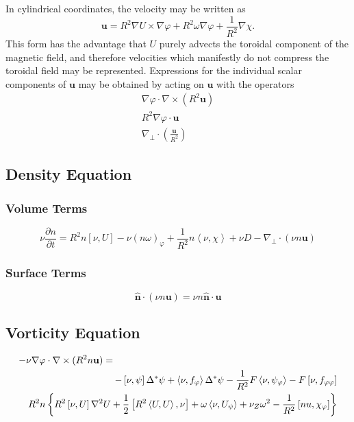 \documentclass[letterpaper]{book}
\newcommand{\ddt}[1]{\frac{\partial #1}{\partial t}}
\renewcommand{\vec}[1]{\ensuremath{\mathbf{#1}}}
\newcommand{\tor}{\varphi}              %
\renewcommand{\u}{\vec{u}}
\newcommand{\grad}[1]{\nabla #1}
\newcommand{\divp}[1]{\nabla_\perp \cdot #1}
\newcommand{\curl}[1]{\nabla \times #1}
\newcommand{\gs}[1]{\Delta^* #1}
\newcommand{\lp}[1]{\nabla^2 #1}
\newcommand{\pb}[2]{\left[#1,#2\right]}
\newcommand{\ip}[2]{\left\langle  #1,#2\right\rangle}
\newcommand{\uvec}[1]{\ensuremath{\vec{\hat{#1}}}}
\newcommand{\n}{\ensuremath{\uvec{n}}}
\begin{document}
In cylindrical coordinates, the velocity may be written as
\begin{equation}
  \u = R^2 \grad{U} \times \grad{\tor} 
  + R^2 \omega \grad{\tor}
  + \frac{1}{R^2}\grad{\chi}.
\end{equation}
This form has the advantage that $U$ purely advects the toroidal
component of the magnetic field, and therefore velocities which
manifestly do not compress the toroidal field may be represented.
Expressions for the individual scalar components of $\u$ may be
obtained by acting on $\u$ with the operators
\begin{subequations}
\begin{eqnarray}
  & \grad{\tor} \cdot \curl{(R^2 \u)} & \\
  &  R^2 \grad{\tor} \cdot \u & \\
  &  \divp{\left(\frac{\u}{R^2}\right)} &
\end{eqnarray}
\end{subequations}

\subsection{Density Equation}

\subsubsection{Volume Terms}

\begin{equation}
  \nu \ddt{n} = 
  R^2 n \pb{\nu}{U} 
  - \nu (n \omega)_\tor
  + \frac{1}{R^2} n \ip{\nu}{\chi} 
  + \nu D
  - \divp{(\nu n \u)}
\end{equation}

\subsubsection{Surface Terms}

\begin{equation}
  \n \cdot (\nu n \u) = \nu n \n \cdot \u
\end{equation}


\subsection{Vorticity Equation}

\begin{eqnarray}
  \lefteqn{-\nu \grad{\tor} \cdot \curl{(R^2 n \u)} = }\\
  & & -\pb{\nu}{\psi}\gs{\psi} + \ip{\nu}{f_\tor}\gs{\psi}
      -\frac{1}{R^2} F \ip{\nu}{\psi_\tor}
      -F \pb{\nu}{f_{\tor \tor}}\\
  & & \mbox{} R^2 n \left\{ R^2 \pb{\nu}{U} \lp{U}
      + \frac{1}{2} \pb{R^2 \ip{U}{U}}{\nu}
      + \omega \ip{\nu}{U_\psi} + \nu_Z \omega^2
      - \frac{1}{R^2} \pb{nu}{\chi_\tor} \right\}
\end{eqnarray}
\end{document}
